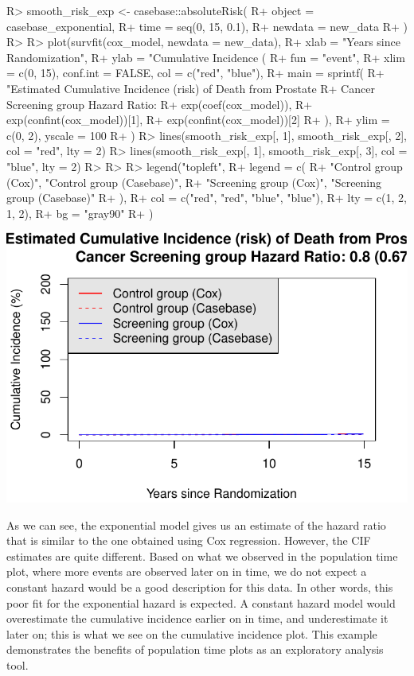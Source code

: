 \documentclass[
]{jss}
\begin{document}
\begin{CodeChunk}

\begin{CodeInput}
R> smooth_risk_exp <- casebase::absoluteRisk(
R+   object = casebase_exponential,
R+   time = seq(0, 15, 0.1),
R+   newdata = new_data
R+ )
R> 
R> plot(survfit(cox_model, newdata = new_data),
R+   xlab = "Years since Randomization",
R+   ylab = "Cumulative Incidence (%
R+   fun = "event",
R+   xlim = c(0, 15), conf.int = FALSE, col = c("red", "blue"),
R+   main = sprintf(
R+     "Estimated Cumulative Incidence (risk) of Death from Prostate 
R+                     Cancer Screening group Hazard Ratio: %
R+     exp(coef(cox_model)),
R+     exp(confint(cox_model))[1],
R+     exp(confint(cox_model))[2]
R+   ),
R+   ylim = c(0, 2), yscale = 100
R+ )
R> lines(smooth_risk_exp[, 1], smooth_risk_exp[, 2], col = "red", lty = 2)
R> lines(smooth_risk_exp[, 1], smooth_risk_exp[, 3], col = "blue", lty = 2)
R> 
R> 
R> legend("topleft",
R+   legend = c(
R+     "Control group (Cox)", "Control group (Casebase)",
R+     "Screening group (Cox)", "Screening group (Casebase)"
R+   ),
R+   col = c("red", "red", "blue", "blue"),
R+   lty = c(1, 2, 1, 2),
R+   bg = "gray90"
R+ )
\end{CodeInput}


\begin{center}\includegraphics{../figures/erspc-casebase-cif-1} \end{center}

\end{CodeChunk}

As we can see, the exponential model gives us an estimate of the hazard
ratio that is similar to the one obtained using Cox regression. However,
the CIF estimates are quite different. Based on what we observed in the
population time plot, where more events are observed later on in time,
we do not expect a constant hazard would be a good description for this
data. In other words, this poor fit for the exponential hazard is
expected. A constant hazard model would overestimate the cumulative
incidence earlier on in time, and underestimate it later on; this is
what we see on the cumulative incidence plot. This example demonstrates
the benefits of population time plots as an exploratory analysis tool.
\end{document}
